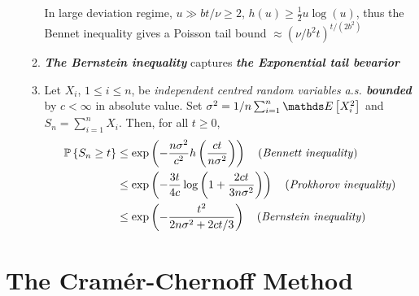 \documentclass[11pt]{article}
\begin{document}
\begin{itemize}
\begin{remark}
\begin{enumerate}
In large deviation regime, $u \gg bt/\nu \ge 2$, $h(u) \ge \frac{1}{2}u \log(u)$, thus the Bennet inequality gives a Poisson tail bound $\approx (\nu/b^2t)^{t /(2 b^2)}$

\item \emph{\textbf{The Bernstein inequality}} captures \emph{\textbf{the Exponential tail bevarior}}

\item Let $X_i$, $1 \le i \le n$, be \emph{independent centred random variables} \emph{a.s. \textbf{bounded}} by $c < \infty$ in absolute value. Set
$\sigma^2 = 1/n\sum^n_{i=1}\E{}{X_i^2}$ and $S_n = \sum^n_{i=1}X_i$. Then, for all $t \ge 0$,
\begin{align*}
{\mathbb P}\left\{S_n \ge  t\right\} &\le \exp\left(-\frac{n\sigma^2}{c^2}h\left(\frac{ct}{n\sigma^2}\right)\right) \quad (\text{\emph{Bennett inequality}})\\
&\le \exp\left(-\frac{3t}{4c}\log\left(1+ \frac{2ct}{3n\sigma^2}\right)\right)  \quad (\text{\emph{Prokhorov inequality}})\\ 
&\le  \exp\left(-\frac{t^2}{2n\sigma^2 + 2ct/3}\right)  \quad (\text{\emph{Bernstein inequality}})\\ 
\end{align*} 
\end{enumerate}

\end{remark}
\end{itemize}

\newpage
\section{The Cram{\'e}r-Chernoff Method}
\end{document}
